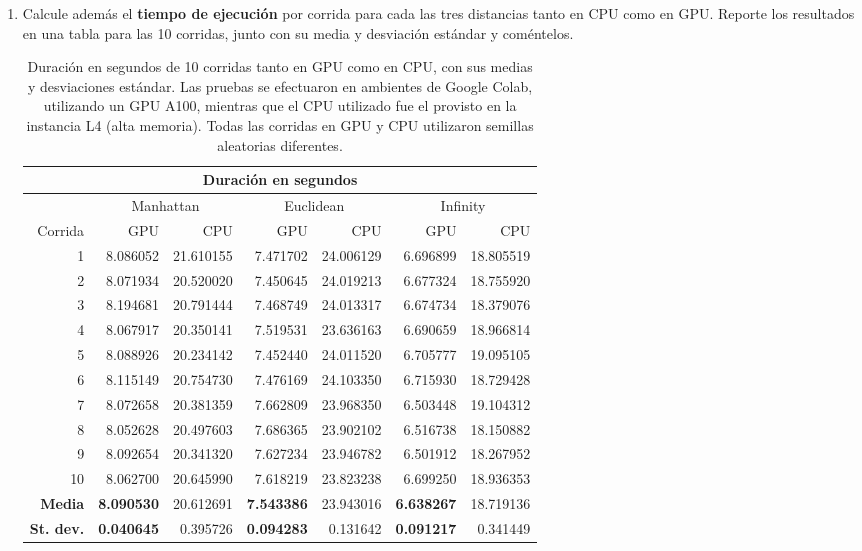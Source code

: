 \documentclass{article}
\begin{document}
\begin{enumerate}
\begin{enumerate}
\begin{enumerate}
\vspace{0.3cm}

\item Calcule además el \textbf{tiempo de ejecución} por corrida para cada las tres distancias tanto en CPU como en GPU. Reporte los resultados en una tabla para las 10 corridas, junto con su media y desviación estándar y coméntelos. 

\begin{table}[H]
    \centering
    \begin{tabular}{r|rrrrrr}
    \toprule
    \multicolumn{7}{c}{\textbf{Duración en segundos}}\\
    \toprule
    & \multicolumn{2}{c}{Manhattan} & \multicolumn{2}{c}{Euclidean} & \multicolumn{2}{c}{Infinity} \\
    Corrida & GPU & CPU & GPU & CPU & GPU & CPU \\
    \midrule
    1 & 8.086052 & 21.610155 & 7.471702 & 24.006129 & 6.696899 & 18.805519 \\
    2 & 8.071934 & 20.520020 & 7.450645 & 24.019213 & 6.677324 & 18.755920 \\
    3 & 8.194681 & 20.791444 & 7.468749 & 24.013317 & 6.674734 &  18.379076 \\
    4 & 8.067917 & 20.350141 & 7.519531 & 23.636163 & 6.690659 &  18.966814 \\
    5 & 8.088926 & 20.234142 & 7.452440 & 24.011520 & 6.705777 &  19.095105 \\
    6 & 8.115149 & 20.754730 & 7.476169 & 24.103350 & 6.715930 &  18.729428 \\
    7 & 8.072658 & 20.381359 & 7.662809 & 23.968350 & 6.503448 &  19.104312 \\
    8 & 8.052628 & 20.497603 & 7.686365 & 23.902102 & 6.516738 & 18.150882 \\
    9 & 8.092654 & 20.341320 & 7.627234 & 23.946782 & 6.501912 &  18.267952 \\
    10 & 8.062700& 20.645990 & 7.618219 & 23.823238 & 6.699250 &  18.936353 \\
    \midrule
    \textbf{Media}    & \textbf{8.090530} & 20.612691 & \textbf{7.543386} & 23.943016 & \textbf{6.638267} &  18.719136 \\
    \textbf{St. dev.} & \textbf{0.040645} & 0.395726 & \textbf{0.094283} & 0.131642 & \textbf{0.091217} &  0.341449 \\
    \bottomrule
    \end{tabular}
    \caption{Duración en segundos de 10 corridas tanto en GPU como en CPU, con sus medias y desviaciones estándar. Las pruebas se efectuaron en ambientes de Google Colab, utilizando un GPU  A100, mientras que el CPU utilizado fue el provisto en la instancia L4 (alta memoria). Todas las corridas en GPU y CPU utilizaron semillas aleatorias diferentes.}
    \label{tab:duracion_10_corridas_gpu_vs_cpu}
\end{table}


\end{enumerate}
\end{enumerate}
\end{enumerate}
\end{document}
